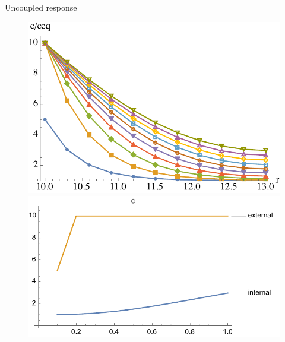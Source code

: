 \documentclass[aspectratio=169,xcolor=dvipsnames]{beamer}
\begin{document}
\begin{frame}{Uncoupled response}
\begin{figure}
\begin{minipage}{\linewidth}
\begin{minipage}{0.3\linewidth}
			\includegraphics[width=\linewidth]{conc_1.pdf}
		\end{minipage}\hfill
		\begin{minipage}{0.3\linewidth}\centering
			\includegraphics[width=\linewidth]{conc.pdf}
		\end{minipage}
	\end{minipage}
\end{figure}
\end{frame}
\end{document}
